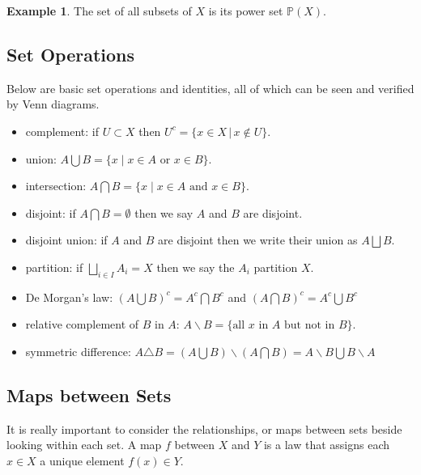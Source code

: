 \documentclass[12pt]{amsart}
\theoremstyle{definition}
\newtheorem{example}[theorem]{Example}
\begin{document}
\begin{example} The set of all subsets of $X$ is its power set $\mathbb{P}(X)$.
\end{example}

\subsection{Set Operations} Below are basic set operations and identities, all of which can be seen and verified by Venn diagrams.
\begin{itemize}
\item complement: if $U \subset X$ then $U^c = \{x \in X \,|\, x \nin U\}$.\\
\item union: $A \bigcup B = \{x \mid x \in A \text{ or } x \in B\}$.\\
\item intersection: $A \bigcap B = \{x \mid x \in A \text{ and } x \in B\}$.\\
\item disjoint: if $A \bigcap B = \emptyset$ then we say $A$ and $B$ are disjoint.\\
\item disjoint union: if $A$ and $B$ are disjoint then we write their union as $A \bigsqcup B$.\\
\item partition: if $\bigsqcup\limits_{i \in I} A_i = X$ then we say the $A_i$ partition $X$.\\
\item De Morgan's law: $(A \bigcup B)^c = A^c \bigcap B^c$ and $(A \bigcap B)^c = A^c \bigcup B^c$\\
\item relative complement of $B$ in $A$: $A\backslash B = \{\text{all } x \text{ in } A \text{ but not in }B\}$.\\
\item symmetric difference: $A \triangle B = (A \bigcup B) \backslash (A \bigcap B) = A \backslash B \bigcup B \backslash A$
\end{itemize}

\subsection{Maps between Sets} It is really important to consider the relationships, or maps between sets beside looking within each set.
\dfn A map $f$ between $X$ and $Y$ is a law that assigns each $x \in X$ a unique element $f(x) \in Y$.
\end{document}
